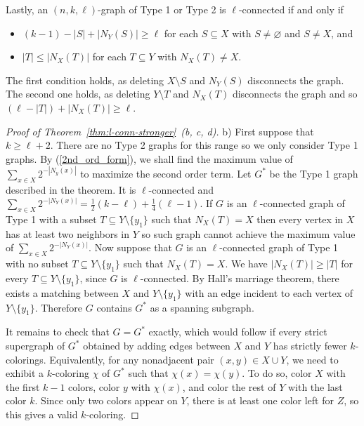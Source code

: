 \documentclass[11pt]{article}
\theoremstyle{plain}
\theoremstyle{definition}
\theoremstyle{remark}
\begin{document}
Lastly, an $(n,k,\ell)$-graph of Type 1 or Type 2 is $\ell$-connected if and only if
\begin{itemize}
    \item  $(k-1)-|S| + |N_Y(S)| \geq \ell$ for each $S \subseteq X$ with $S \neq \varnothing$ and $S \neq X$, and
    \item  $|T| \leq |N_{X}(T)|$ for each $T \subseteq Y$ with $N_{X}(T) \neq X$.
\end{itemize}

The first condition holds, as deleting $X\setminus S$ and $N_Y(S)$ disconnects the graph. The second one holds, as deleting $Y\setminus T$ and $N_{X}(T)$ disconnects the graph and so $(\ell -|T|)+|N_X(T)|\geq \ell$.

\begin{proof}[Proof of Theorem~\ref{thm:l-conn-stronger}~(b, c, d)]
b) First suppose that $k\geq \ell +2$. There are no Type 2 graphs for this range so we only consider Type 1 graphs. By (\ref{2nd_ord_form}), we shall find the maximum value of $\sum_{x\in X}2^{-{|N_y(x)|}}$ to maximize the second order term. Let  $G^*$ be the Type 1 graph described in the theorem. It is $\ell$-connected  and $\sum_{x\in X}2^{-{|N_Y(x)|}}=\frac{1}{2}(k-\ell)+\frac{1}{4}(\ell -1)$.  If $G$ is an $\ell$-connected graph of Type 1 with a subset $T\subseteq Y\setminus \{y_1\}$ such that $N_X(T)=X$ then  every vertex in $X$ has at least two neighbors in $Y$ so such graph cannot achieve the maximum value of $\sum_{x\in X}2^{-{|N_Y(x)|}}$. Now suppose that $G$ is an $\ell$-connected graph of Type 1 with no subset  $T\subseteq Y\setminus \{y_1\}$ such that $N_X(T)=X$. We have $|N_X(T)|\geq |T|$ for every $T\subseteq Y\setminus \{y_1\}$, since $G$ is $\ell$-connected. By Hall's marriage theorem, there exists a matching between $X$ and $Y\setminus \{y_1\}$ with an edge incident to each vertex of $Y\setminus\{y_1\}$. Therefore $G$ contains $G^*$ as a spanning subgraph.

It remains to check that $G=G^*$ exactly, which would follow if every strict supergraph of $G^*$ obtained by adding edges between $X$ and $Y$ has strictly fewer $k$-colorings. Equivalently, for any nonadjacent pair $(x,y)\in X\cup Y$, we need to exhibit a $k$-coloring $\chi$ of $G^*$ such that $\chi(x)=\chi(y)$. To do so, color $X$ with the first $k-1$ colors, color $y$ with $\chi(x)$, and color the rest of $Y$ with the last color $k$. Since only two colors appear on $Y$, there is at least one color left for $Z$, so this gives a valid $k$-coloring. 


\end{proof}
\end{document}
